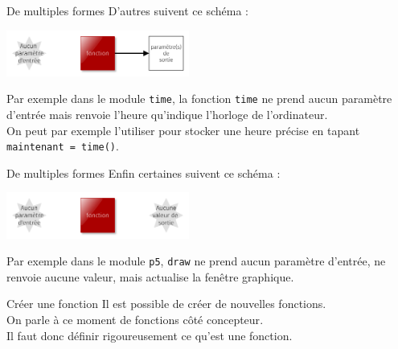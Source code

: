 \documentclass[10pt]{beamer}
\begin{document}
    \begin{frame}{De multiples formes}
        D'autres suivent ce schéma :
        \begin{center}
            \includegraphics[width=6cm]{img/fonction5.png}
        \end{center}\pause
        Par exemple dans le module \texttt{time}, la fonction \texttt{time} ne prend aucun paramètre d'entrée mais renvoie l'heure qu'indique l'horloge de l'ordinateur.\pause\\
        On peut par exemple l'utiliser pour stocker une heure précise en tapant \texttt{maintenant = time()}.
    \end{frame}

    \begin{frame}{De multiples formes}
        Enfin certaines suivent ce schéma :
        \begin{center}
            \includegraphics[width=6cm]{img/fonction6.png}
        \end{center}\pause
        Par exemple dans le module \texttt{p5}, \texttt{draw} ne prend aucun paramètre d'entrée, ne renvoie aucune valeur, mais actualise la fenêtre graphique.\pause
    \end{frame}
    \begin{frame}{Créer une fonction}
        Il est possible de créer de nouvelles fonctions.\\
        On parle à ce moment de fonctions \alert{côté concepteur}.\\

        Il faut donc définir rigoureusement ce qu'est une fonction.
    \end{frame}
\end{document}
